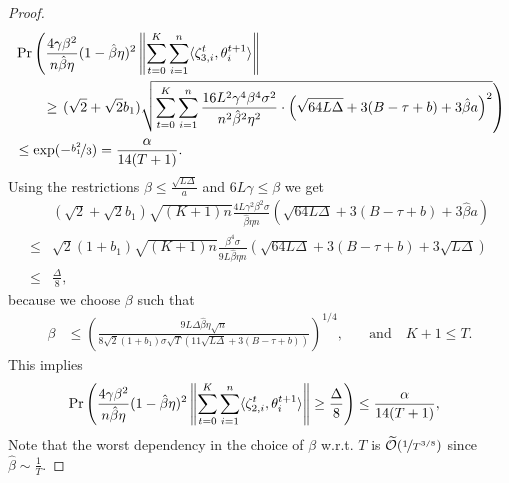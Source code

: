 \documentclass[a4paper,11pt]{article}
\begin{document}
\begin{proof}
    \begin{align*}
    &\Pr\left(\frac{4\gamma\beta^2}{n\hat{\beta}\eta}(1-\hat{\beta}\eta)^2\left\|\sum_{t=0}^K\sum_{i=1}^n\<\zeta_{3,i}^t,\theta^{t+1}_i>\right\| \right.\\
    &\qquad\ge \left.(\sqrt{2}+\sqrt{2}b_1)\sqrt{\sum_{t=0}^K\sum_{i=1}^n \frac{16L^2\gamma^4\beta^{4}\sigma^2}{n^2\hat{\beta}^2\eta^2}\cdot \left(\sqrt{64L\Delta} + 3(B-\tau + b) + 3\hat{\beta}a\right)^2}\right)\\ 
    &\le \exp(-\nicefrac{b_1^2}{3}) = \frac{\alpha}{14(T+1)}.
    \end{align*}
    Using the restrictions $\hat{\beta} \le \frac{\sqrt{L\Delta}}{a}$ and $6L\gamma\le \beta$ we get
    \begin{align*}
    &(\sqrt{2}+\sqrt{2}b_1)\sqrt{(K+1)n}\frac{4L\gamma^2\beta^2\sigma}{\hat{\beta}\eta n}\left(\sqrt{64L\Delta} + 3(B-\tau + b) + 3\hat{\beta}a\right)\\
    \le & 
    \sqrt{2}(1+b_1)\sqrt{(K+1)n}\frac{\beta^{4}\sigma}{9L\hat{\beta}\eta n}\left(\sqrt{64L\Delta} + 3(B-\tau+b) + 3\sqrt{L\Delta}\right)\\ \le & \frac{\Delta}{8},
    \end{align*}
    because we choose $\beta$ such that
    \begin{align}\label{eq:stepsize_bound_4}
    \beta &\le \left(\frac{9L\Delta\hat{\beta}\eta\sqrt{n}}{8\sqrt{2}(1+b_1)\sigma\sqrt{T}\left(11\sqrt{L\Delta} + 3(B-\tau+b)\right)}\right)^{1/4},
    &\quad \text{and} \quad K+1\le T.
    \end{align}
    This implies 
    \begin{align*}
    &\Pr\left(\frac{4\gamma\beta^2}{n\hat{\beta}\eta}(1-\hat{\beta}\eta)^2\left\|\sum_{t=0}^K\sum_{i=1}^n\<\zeta_{2,i}^t,\theta^{t+1}_i>\right\| \ge \frac{\Delta}{8}\right) \le \frac{\alpha}{14(T+1)},
    \end{align*}
    Note that the worst dependency in the choice of $\beta$ w.r.t. $T$ is $\widetilde{\mathcal O}(\nicefrac{1}{T^{3/8}})$ since $\hat{\beta} \sim \frac{1}{T}.$

   
    

\end{proof}
\end{document}
